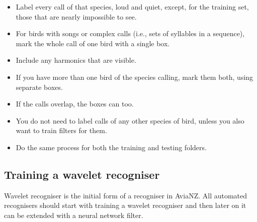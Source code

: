 \documentclass{scrartcl}
\begin{document}
\begin{description}
\begin{itemize}
\item Label every call of that species, loud and quiet, except, for the training set, those that are nearly impossible to see.
\item For birds with songs or complex calls (i.e., sets of syllables in a sequence), mark the whole call of one bird with a single box. 
\item Include any harmonics that are visible. 
\item If you have more than one bird of the species calling, mark them both, using separate boxes. 
\item If the calls overlap, the boxes can too. 
\item You do not need to label calls of any other species of bird, unless you also want to train filters for them. 
\item Do the same process for both the training and testing folders.
\end{itemize}
\end{description}

\subsection{Training a wavelet recogniser}
Wavelet recogniser is the initial form of a recogniser in AviaNZ. All automated recognisers should start with training a wavelet recogniser and then later on it can be extended with a neural network filter.
\end{document}
